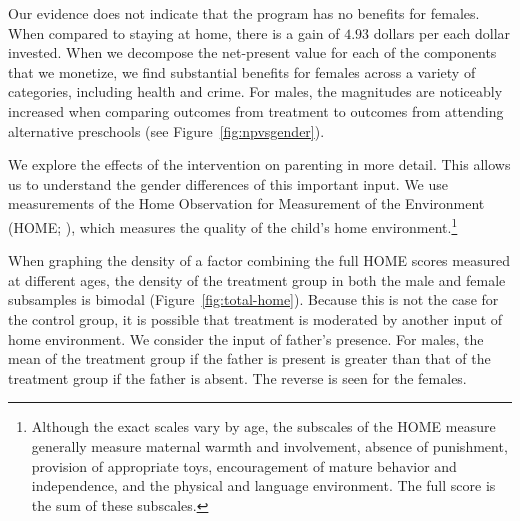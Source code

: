 Our evidence does not indicate that the program has no benefits for females. When compared to staying at home, there is a gain of $4.93$ dollars per each dollar invested. When we decompose the net-present value for each of the components that we monetize, we find substantial benefits for females across a variety of categories, including health and crime. For males, the magnitudes are noticeably increased when comparing outcomes from treatment to outcomes from attending alternative preschools (see Figure~\ref{fig:npvsgender}).

We explore the effects of the intervention on parenting in more detail. This allows us to understand the gender differences of this important input. We use measurements of the Home Observation for Measurement of the Environment (HOME; \citet{Bradley-Caldwell_1977_AJMD}), which measures the quality of the child's home environment.\footnote{Although the exact scales vary by age, the subscales of the HOME measure generally measure maternal warmth and involvement, absence of punishment, provision of appropriate toys, encouragement of mature behavior and independence, and the physical and language environment. The full score is the sum of these subscales.}

When graphing the density of a factor combining the full HOME scores measured at different ages, the density of the treatment group in both the male and female subsamples is bimodal (Figure~\ref{fig:total-home}). Because this is not the case for the control group, it is possible that treatment is moderated by another input of home environment. We consider the input of father's presence. For males, the mean of the treatment group if the father is present is greater than that of the treatment group if the father is absent. The reverse is seen for the females. 

